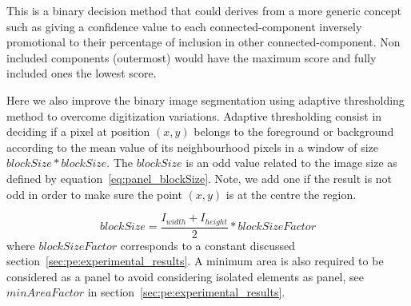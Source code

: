 This is a binary decision method that could derives from a more generic concept such as giving a confidence value to each connected-component inversely promotional to their percentage of inclusion in other connected-component.
Non included components (outermost) would have the maximum score and fully included ones the lowest score.

Here we also improve the binary image segmentation using adaptive thresholding method to overcome digitization variations.
Adaptive thresholding consist in deciding if a pixel at position $(x,y)$ belongs to the foreground or background according to the mean value of its neighbourhood pixels in a window of size $blockSize * blockSize$.
The $blockSize$ is an odd value related to the image size as defined by equation~\ref{eq:panel_blockSize}.
Note, we add one if the result is not odd in order to make sure the point $(x,y)$ is at the centre the region.

\begin{equation}
\label{eq:panel_blockSize}
	blockSize = \frac{I_{width} + I_{height}}{2} * blockSizeFactor
\end{equation}
where $blockSizeFactor$ corresponds to a constant discussed section~\ref{sec:pe:experimental_results}. 
A minimum area is also required to be considered as a panel to avoid considering isolated elements as panel, see $minAreaFactor$ in section~\ref{sec:pe:experimental_results}.


